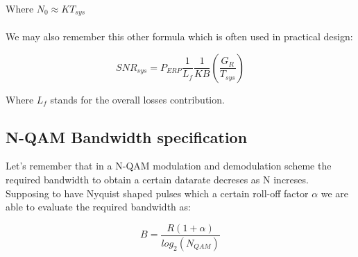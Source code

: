 Where $N_0 \approx KT_{sys}$\\
\\
We may also remember this other formula which is often used in practical design:

\begin{equation}
	SNR_{sys}= P_{ERP}\frac{1}{L_f}\frac{1}{KB}\left( \frac{G_R}{T_{sys}}\right)
\end{equation}

Where $L_f$ stands for the overall losses contribution.

\subsection{N-QAM Bandwidth specification} %
\label{sub:n_qam}

Let's remember that in a N-QAM modulation and demodulation scheme the required bandwidth to obtain a certain datarate decreses as N increses.
Supposing to have Nyquist shaped pulses which a certain roll-off factor $\alpha$ we are able to evaluate the required bandwidth as:

\begin{equation}
	B= \frac {R(1+ \alpha)} {log_2(N_{QAM})}
\end{equation}





